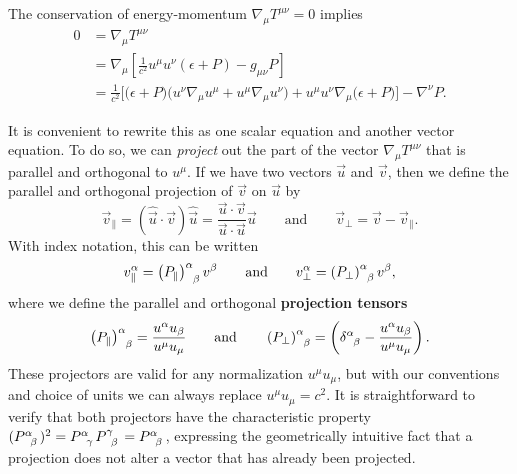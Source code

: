 The conservation of energy-momentum $\nabla_\mu T^{\mu \nu} = 0$ implies
\begin{align}
	0 &= \nabla_\mu T^{\mu \nu} \nonumber \\
	  &= \nabla_\mu \left[ \frac{1}{c^2} u^\mu u^\nu (\epsilon + P) - g_{\mu \nu} P \right] \nonumber \\
	  &= \frac{1}{c^2} \bigg[ \Big( \epsilon + P \Big) \Big( u^\nu \nabla_\mu u^\mu + u^\mu \nabla_\mu u^\nu \Big) + u^\mu u^\nu \nabla_\mu \Big( \epsilon + P \Big) \bigg] - \nabla^\nu P . \label{eq:relfluid:conservation_energy_momentum}
\end{align}

It is convenient to rewrite this as one scalar equation and another vector equation.
To do so, we can \emph{project} out the part of the vector $\nabla_\mu T^{\mu \nu}$ that is parallel and orthogonal to $u^\mu$.
If we have two vectors $\vec{u}$ and $\vec{v}$, then we define the parallel and orthogonal projection of $\vec{v}$ on $\vec{u}$ by
\begin{equation}
	\vec{v}_\parallel = \left( \hat{\vec{u}} \cdot \vec{v} \right) \hat{\vec{u}} = \frac{\vec{u} \cdot \vec{v}}{\vec{u} \cdot \vec{u}} \vec{u}
	\qquad \text{and} \qquad
	\vec{v}_\perp = \vec{v} - \vec{v}_\parallel .
\end{equation}
With index notation, this can be written
\begin{equation}
	v_\parallel^\alpha = \left(P_\parallel\right)\indices{^\alpha_\beta} v^\beta
	\qquad \text{and} \qquad
	v_\perp^\alpha = \left(P_\perp\right)\indices{^\alpha_\beta} v^\beta ,
\end{equation}
where we define the parallel and orthogonal \textbf{projection tensors}
\begin{equation}
	\left(P_\parallel\right) \indices{^\alpha_\beta} = \frac{u^\alpha u_\beta}{u^\mu u_\mu}
	\qquad \text{and} \qquad
	\left(P_\perp\right) \indices{^\alpha_\beta} = \left( \delta\indices{^\alpha_\beta} - \frac{u^\alpha u_\beta}{u^\mu u_\mu} \right) .
\label{eq:relfluid:projection_tensors}
\end{equation}
These projectors are valid for any normalization $u^\mu u_\mu$, but with our conventions and choice of units we can always replace $u^\mu u_\mu = c^2$.
It is straightforward to verify that both projectors have the characteristic property $( P\indices{^\alpha_\beta} )^2 = P\indices{^\alpha_\gamma} P\indices{^\gamma_\beta} = P\indices{^\alpha_\beta}$,
expressing the geometrically intuitive fact that a projection does not alter a vector that has already been projected.

